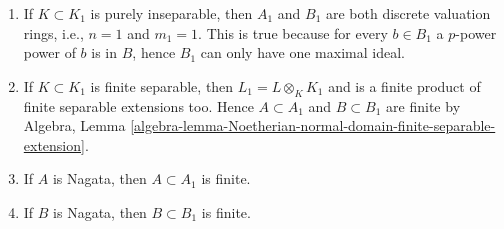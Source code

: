 \begin{remark}
\begin{enumerate}
is a product of discrete valuation rings, i.e., $m_i = 1$ for
$i = 1, \ldots, n$.
\item If $K \subset K_1$ is purely inseparable, then $A_1$ and $B_1$
are both discrete valuation rings, i.e., $n = 1$ and $m_1 = 1$.
This is true because for every $b \in B_1$ a $p$-power power of $b$
is in $B$, hence $B_1$ can only have one maximal ideal.
\item If $K \subset K_1$ is finite separable, then $L_1 = L \otimes_K K_1$
and is a finite product of finite separable extensions too. Hence
$A \subset A_1$ and $B \subset B_1$ are finite by
Algebra, Lemma
\ref{algebra-lemma-Noetherian-normal-domain-finite-separable-extension}.
\item If $A$ is Nagata, then $A \subset A_1$ is finite.
\item If $B$ is Nagata, then $B \subset B_1$ is finite.
\end{enumerate}
\end{remark}
